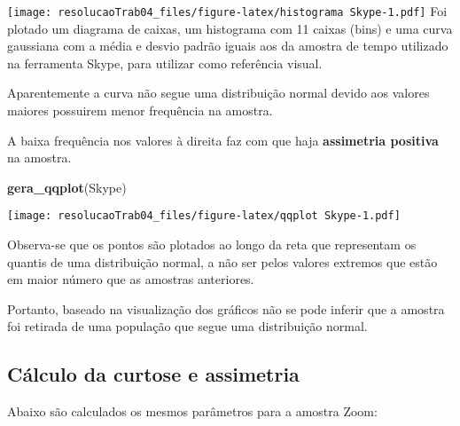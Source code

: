 \documentclass[
]{article}
\newenvironment{Shaded}{\begin{snugshade}}{\end{snugshade}}
\newcommand{\CharTok}[1]{\textcolor[rgb]{0.31,0.60,0.02}{#1}}
\newcommand{\KeywordTok}[1]{\textcolor[rgb]{0.13,0.29,0.53}{\textbf{#1}}}
\newcommand{\NormalTok}[1]{#1}
\newcommand{\OperatorTok}[1]{\textcolor[rgb]{0.81,0.36,0.00}{\textbf{#1}}}
\newcommand{\StringTok}[1]{\textcolor[rgb]{0.31,0.60,0.02}{#1}}
\begin{document}
\texttt{[image: resolucaoTrab04\_files/figure-latex/histograma Skype-1.pdf]}
Foi plotado um diagrama de caixas, um histograma com 11 caixas (bins) e
uma curva gaussiana com a média e desvio padrão iguais aos da amostra de
tempo utilizado na ferramenta Skype, para utilizar como referência
visual.

Aparentemente a curva não segue uma distribuição normal devido aos
valores maiores possuirem menor frequência na amostra.

A baixa frequência nos valores à direita faz com que haja
\textbf{assimetria positiva} na amostra.

\begin{Shaded}
\begin{Highlighting}[]
\KeywordTok{gera_qqplot}\NormalTok{(Skype)}
\end{Highlighting}
\end{Shaded}

\texttt{[image: resolucaoTrab04\_files/figure-latex/qqplot Skype-1.pdf]}

Observa-se que os pontos são plotados ao longo da reta que representam
os quantis de uma distribuição normal, a não ser pelos valores extremos
que estão em maior número que as amostras anteriores.

Portanto, baseado na visualização dos gráficos não se pode inferir que a
amostra foi retirada de uma população que segue uma distribuição normal.

\hypertarget{cuxe1lculo-da-curtose-e-assimetria-2}{%
\subsection{Cálculo da curtose e
assimetria}\label{cuxe1lculo-da-curtose-e-assimetria-2}}

Abaixo são calculados os mesmos parâmetros para a amostra Zoom:

\begin{Shaded}
\end{Shaded}
\end{document}
